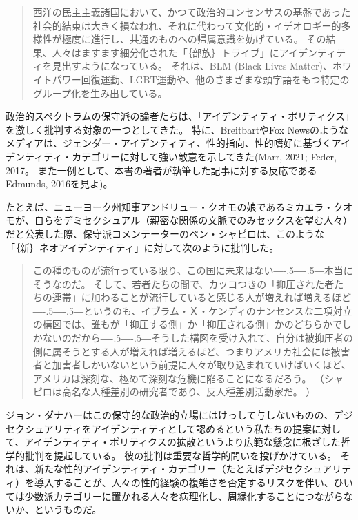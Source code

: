 \documentclass[paper=a4,book,openany]{jlreq}
\def\DDASH{―\kern-.5\zw―\kern-.5\zw―} %
\begin{document}
\begin{quote}
西洋の民主主義諸国において、かつて政治的コンセンサスの基盤であった社会的結束は大きく損なわれ、それに代わって文化的・イデオロギー的多様性が極度に進行し、共通のものへの帰属意識を妨げている。
その結果、人々はますます細分化された「｛部族｝{トライブ}」にアイデンティティを見出すようになっている。
それは、BLM (Black Lives Matter)、ホワイトパワー回復運動、LGBT運動や、他のさまざまな頭字語をもつ特定のグループ化を生み出している。
\citep{gardels18:_franc_fukuy}
\end{quote}

政治的スペクトラムの保守派の論者たちは、「アイデンティティ・ポリティクス」を激しく批判する対象の一つとしてきた。
特に、BreitbartやFox Newsのようなメディアは、ジェンダー・アイデンティティ、性的指向、性的嗜好に基づくアイデンティティ・カテゴリーに対して強い敵意を示してきた(Marr, 2021; Feder, 2017。
また一例として、本書の著者が執筆した記事に対する反応であるEdmunds, 2016を見よ)。
\nocite{edmunds16:_eco_sexual_boast_mastur_water}
\nocite{marr21:_fox_news_has_consis_enabl,feder17:_steve_bannon_gay_agend}

たとえば、ニューヨーク州知事アンドリュー・クオモの娘であるミカエラ・クオモが、自らをデミセクシュアル（親密な関係の文脈でのみセックスを望む人々）だと公表した際、保守派コメンテーターのベン・シャピロは、このような「｛新｝{ネオ}アイデンティティ」に対して次のように批判した。

\begin{quote}
この種のものが流行っている限り、この国に未来はない{\DDASH}本当にそうなのだ。
そして、若者たちの間で、カッコつきの「抑圧された者たちの連帯」に加わることが流行していると感じる人が増えれば増えるほど{\DDASH}というのも、イブラム・Ｘ・ケンディのナンセンスな二項対立の構図では、誰もが「抑圧する側」か「抑圧される側」かのどちらかでしかないのだから{\DDASH}そうした構図を受け入れて、自分は被抑圧者の側に属そうとする人が増えれば増えるほど、つまりアメリカ社会には被害者と加害者しかいないという前提に人々が取り込まれていけばいくほど、アメリカは深刻な、極めて深刻な危機に陥ることになるだろう。
\citep{shapiro21:_andrew_cuomos_daugh_comes_out_demis} （シャピロは高名な人種差別の研究者であり、反人種差別活動家だ。
）

\end{quote}

ジョン・ダナハーはこの保守的な政治的立場にはけっして与しないものの、デジセクシュアリティをアイデンティティとして認めるという私たちの提案に対して、アイデンティティ・ポリティクスの拡散というより広範な懸念に根ざした哲学的批判を提起している。
彼の批判は重要な哲学的問いを投げかけている。
それは、新たな性的アイデンティティ・カテゴリー（たとえばデジセクシュアリティ）を導入することが、人々の性的経験の複雑さを否定するリスクを伴い、ひいては少数派カテゴリーに置かれる人々を病理化し、周縁化することにつながらないか、というものだ。
\end{document}
